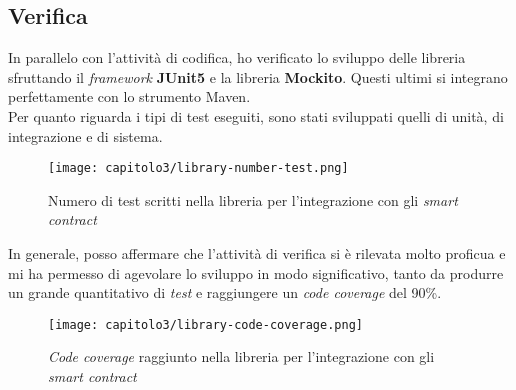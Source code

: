 \subsection{Verifica}
In parallelo con l'attività di codifica, ho verificato lo sviluppo delle libreria sfruttando il \textit{framework} \textbf{JUnit5} e la libreria \textbf{Mockito}. Questi ultimi si integrano perfettamente con lo strumento Maven. \\

Per quanto riguarda i tipi di test eseguiti, sono stati sviluppati quelli di unità, di integrazione e di sistema.

\begin{figure}[h!]
  \centering
  \texttt{[image: capitolo3/library-number-test.png]}
  \caption{Numero di test scritti nella libreria per l'integrazione con gli \textit{smart contract}}
\end{figure}

In generale, posso affermare che l'attività di verifica si è rilevata molto proficua e mi ha permesso di agevolare lo sviluppo in modo significativo, tanto da produrre un grande quantitativo di \textit{test} e raggiungere un \textit{code coverage} del 90\%.

\begin{figure}[h!]
  \centering
  \texttt{[image: capitolo3/library-code-coverage.png]}
  \caption{\textit{Code coverage} raggiunto nella libreria per l'integrazione con gli \textit{smart contract}}
\end{figure}
